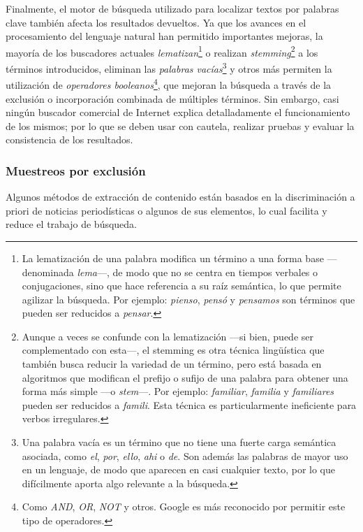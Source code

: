 \documentclass[letterpaper, 11pt]{book}
\theoremstyle{definition}
\theoremstyle{remark}
\begin{document}
Finalmente, el motor de búsqueda utilizado para localizar textos por palabras clave también afecta los resultados devueltos. Ya que los avances en el procesamiento del lenguaje natural han permitido importantes mejoras, la mayoría de los buscadores actuales \emph{lematizan}\footnote{
La lematización de una palabra modifica un término a una forma base ---denominada \emph{lema}---, de modo que no se centra en tiempos verbales o conjugaciones, sino que hace referencia a su raíz semántica, lo que permite agilizar la búsqueda. Por ejemplo: \emph{pienso}, \emph{pensó} y \emph{pensamos} son términos que pueden ser reducidos a 	\emph{pensar}.}
o realizan \emph{stemming}\footnote{
Aunque a veces se confunde con la lematización ---si bien, puede ser complementado con esta---, el stemming es otra técnica lingüística que también busca reducir la variedad de un término, pero está basada en algoritmos que modifican el prefijo o sufijo de una palabra para obtener una forma más simple ---o \emph{stem}---. Por ejemplo: \emph{familiar}, \emph{familia} y \emph{familiares} pueden ser reducidos a \emph{famili}. Esta técnica es particularmente ineficiente para verbos irregulares.}
a los términos introducidos, eliminan las \emph{palabras vacías}\footnote{
Una palabra vacía es un término que no tiene una fuerte carga semántica asociada, como \emph{el}, \emph{por}, \emph{ello}, \emph{ahi} o \emph{de}. Son además las palabras de mayor uso en un lenguaje, de modo que aparecen en casi cualquier texto, por lo que difícilmente aporta algo relevante a la búsqueda.}
 y otros más permiten la utilización de \emph{operadores booleanos}\footnote{
Como \emph{AND}, \emph{OR}, \emph{NOT} y otros. Google es más reconocido por permitir este tipo de operadores.},
que mejoran la búsqueda a través de la exclusión o incorporación combinada de múltiples términos. Sin embargo, casi ningún buscador comercial de Internet explica detalladamente el funcionamiento de los mismos; por lo que se deben usar con cautela, realizar pruebas y evaluar la consistencia de los resultados.



\subsubsection{Muestreos por exclusión}
\label{sec:sesgoMuestreo_temporal}

Algunos métodos de extracción de contenido están basados en la discriminación a priori de noticias periodísticas o algunos de sus elementos, lo cual facilita y reduce el trabajo de búsqueda.
\end{document}
